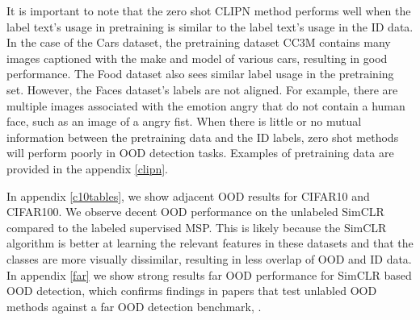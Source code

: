 \documentclass{article} %
\theoremstyle{plain}
\theoremstyle{definition}
\theoremstyle{remark}
\begin{document}
It is important to note that the zero shot CLIPN method performs well when the label text's usage in pretraining is similar to the label text's usage in the ID data. In the case of the Cars dataset, the pretraining dataset CC3M \citep{sharma2018conceptual} contains many images captioned with the make and model of various cars, resulting in good performance. The Food dataset also sees similar label usage in the pretraining set. However, the Faces dataset's labels are not aligned. For example, there are multiple images associated with the emotion angry that do not contain a human face, such as an image of a angry fist. When there is little or no mutual information between the pretraining data and the ID labels, zero shot methods will perform poorly in OOD detection tasks. Examples of pretraining data are provided in the appendix \ref{clipn}.


In appendix \ref{c10tables}, we show adjacent OOD results for CIFAR10 and CIFAR100. We observe decent OOD performance on the unlabeled SimCLR compared to the labeled supervised MSP. This is likely because the SimCLR algorithm is better at learning the relevant features in these datasets and that the classes are more visually dissimilar, resulting in less overlap of OOD and ID data. In appendix \ref{far} we show strong results far OOD performance for SimCLR based OOD detection, which confirms findings in papers that test unlabled OOD methods against a far OOD detection benchmark, \citep{sehwag2021ssd, tack2020csi, liu2023unsupervised, guille2024cadet, wang2023clipn}.

\label{results}


\renewcommand{\bfdefault}{b}
\end{document}
